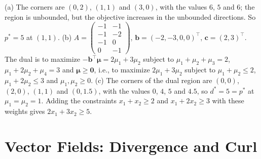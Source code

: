 \documentclass[11pt]{article}
\begin{document}
\begin{description}[leftmargin=0pt, itemsep=0.3em]
\item[\ref{pr:lp-dual}.] (a) The corners are $(0, 2)$, $(1, 1)$ and $(3, 0)$, with the values $6$, $5$ and $6$; the region is unbounded, but the objective increases in the unbounded directions. So $p^* = 5$ at $(1, 1)$. (b) $A = \begin{pmatrix} -1 & -1 \\ -1 & -2 \\ -1 & 0 \\ 0 & -1 \end{pmatrix}$, $\mathbf{b} = (-2, -3, 0, 0)^\top$, $\mathbf{c} = (2, 3)^\top$. The dual is to maximize $-\mathbf{b}^\top\boldsymbol{\mu} = 2\mu_1 + 3\mu_2$ subject to $\mu_1 + \mu_2 + \mu_3 = 2$, $\mu_1 + 2\mu_2 + \mu_4 = 3$ and $\boldsymbol{\mu} \geq \mathbf{0}$, i.e., to maximize $2\mu_1 + 3\mu_2$ subject to $\mu_1 + \mu_2 \leq 2$, $\mu_1 + 2\mu_2 \leq 3$ and $\mu_1, \mu_2 \geq 0$. (c) The corners of the dual region are $(0, 0)$, $(2, 0)$, $(1, 1)$ and $(0, 1.5)$, with the values $0$, $4$, $5$ and $4.5$, so $d^* = 5 = p^*$ at $\mu_1 = \mu_2 = 1$. Adding the constraints $x_1 + x_2 \geq 2$ and $x_1 + 2x_2 \geq 3$ with these weights gives $2x_1 + 3x_2 \geq 5$.
\end{description}

\section*{Vector Fields: Divergence and Curl}
\end{document}
